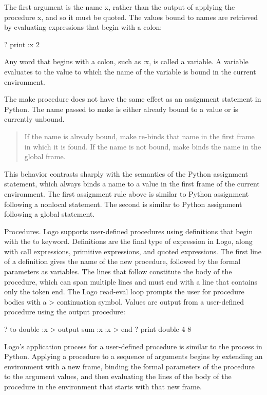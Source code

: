 \documentclass[letterpaper,10pt,dvipdfmx]{sphinxmanual}
\begin{document}
The first argument is the name x, rather than the output of applying the procedure x, and so it must be quoted. The values bound to names are retrieved by evaluating expressions that begin with a colon:

? print :x
2

Any word that begins with a colon, such as :x, is called a variable. A variable evaluates to the value to which the name of the variable is bound in the current environment.

The make procedure does not have the same effect as an assignment statement in Python. The name passed to make is either already bound to a value or is currently unbound.
\begin{quote}

If the name is already bound, make re-binds that name in the first frame in which it is found.
If the name is not bound, make binds the name in the global frame.
\end{quote}

This behavior contrasts sharply with the semantics of the Python assignment statement, which always binds a name to a value in the first frame of the current environment. The first assignment rule above is similar to Python assignment following a nonlocal statement. The second is similar to Python assignment following a global statement.

Procedures. Logo supports user-defined procedures using definitions that begin with the to keyword. Definitions are the final type of expression in Logo, along with call expressions, primitive expressions, and quoted expressions. The first line of a definition gives the name of the new procedure, followed by the formal parameters as variables. The lines that follow constitute the body of the procedure, which can span multiple lines and must end with a line that contains only the token end. The Logo read-eval loop prompts the user for procedure bodies with a \textgreater{} continuation symbol. Values are output from a user-defined procedure using the output procedure:

? to double :x
\textgreater{} output sum :x :x
\textgreater{} end
? print double 4
8

Logo's application process for a user-defined procedure is similar to the process in Python. Applying a procedure to a sequence of arguments begins by extending an environment with a new frame, binding the formal parameters of the procedure to the argument values, and then evaluating the lines of the body of the procedure in the environment that starts with that new frame.
\end{document}
